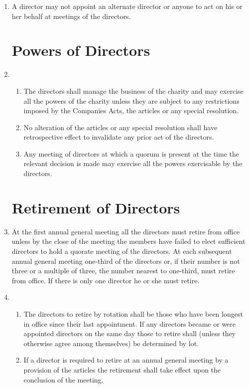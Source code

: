 \begin{enumerate}
\item
  A director may not appoint an alternate director or anyone to act
  on his or her behalf at meetings of the directors.

\section{Powers of Directors}

\item
  \begin{enumerate}
  \item
    The directors shall manage the business of the charity and may
    exercise all the powers of the charity unless they are subject to
    any restrictions imposed by the Companies Acts, the articles or any
    special resolution.
  \item
    No alteration of the articles or any special resolution shall have
    retrospective effect to invalidate any prior act of the directors.
  \item
    Any meeting of directors at which a quorum is present at the time
    the relevant decision is made may exercise all the powers
    exercisable by the directors.
  \end{enumerate}

\section{Retirement of Directors}

\item
    At the first annual general meeting all the directors must retire from
    office unless by the close of the meeting the members have failed to
    elect sufficient directors to hold a quorate meeting of the directors. At
    each subsequent annual general meeting one-third of the directors or, if
    their number is not three or a multiple of three, the number nearest to
    one-third, must retire from office. If there is only one director he or she
    must retire.

\item
  \begin{enumerate}
  \item
    The directors to retire by rotation shall be those who have been
    longest in office since their last appointment. If any directors
    became or were appointed directors on the same day those to retire
    shall (unless they otherwise agree among themselves) be determined
    by lot.
  \item
    If a director is required to retire at an annual general meeting by
    a provision of the articles the retirement shall take effect upon
    the conclusion of the meeting.
  \end{enumerate}


\end{enumerate}
